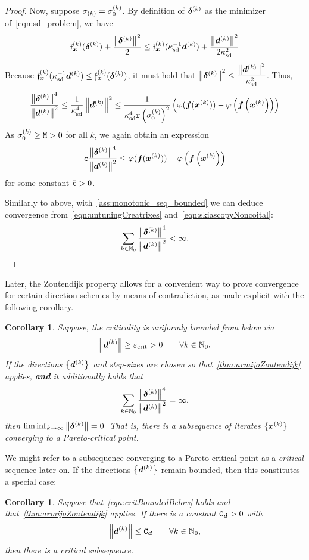 \documentclass{article}
\theoremstyle{plain}
\newtheorem{corollary}[theorem]{Corollary}
\theoremstyle{definition}
\begin{document}
\begin{proof}
	Now, suppose $\sigma_{(k)} = \sigma^{(k)}_{0}$.
	By definition of $\bm{\delta}^{(k)}$ as the minimizer of~\eqref{eqn:sd_problem}, we have
	$$
	\mathfrak{f}_{\bm{x}}^{(k)}(\bm{\delta}^{(k)}) + \frac{\left\|\bm{\delta}^{(k)}\right\|^2}{2}
	\leq
	\mathfrak{f}_{\bm{x}}^{(k)}(\kappa_{\mathrm{sd}}^{-1}\bm{d}^{(k)}) + \frac{\left\|\bm{d}^{(k)}\right\|^2}{2\kappa_{\mathrm{sd}}^2}
	$$
	Because $\mathfrak{f}_{\bm{x}}^{(k)}(\kappa_{\mathrm{sd}}^{-1}\bm{d}^{(k)}) \leq \mathfrak{f}_{\bm{x}}^{(k)}(\bm{\delta}^{(k)})$,
	it must hold that $\left\|\bm{\delta}^{(k)}\right\|^2 \leq \dfrac{\left\|\bm{d}^{(k)}\right\|^2}{\kappa_{\mathrm{sd}}^2}$.
	Thus,
	$$
	\frac{
		\left\|\bm{\delta}^{(k)}\right\|^4
	}{
		\left\|\bm{d}^{(k)}\right\|^2
	}
	\leq
	\frac{1}{\kappa_{\mathrm{sd}}^4}
	\left\|\bm{d}^{(k)}\right\|^2
	\leq
	\frac{1}{\kappa_{\mathrm{sd}}^4\mathtt{r}\left(\sigma^{(k)}_{0}\right)^2}
	\left(
	\varphi(\bm{f}(\bm{x}^{(k)}))
	-
	\varphi\left(\bm{f}\left(\bm{x}^{(k)}\right)\right)
	\right)
	$$
	As $\sigma^{(k)}_{0} \ge \mathtt{M} > 0$ for all $k$,
	we again obtain an expression
	\begin{equation}
	\bar{\mathtt c}
	\frac{
		\left\|\bm{\delta}^{(k)}\right\|^4
	}{
		\left\|\bm{d}^{(k)}\right\|^2
	}
	\leq
	\varphi(\bm{f}(\bm{x}^{(k)}))
	-
	\varphi\left(\bm{f}\left(\bm{x}^{(k)}\right)\right)
	\label{eqn:skiascopyNoncoital}
    \end{equation}
	for some constant $\bar{\mathtt c}>0$.

	Similarly to above,
	with~\cref{ass:monotonic_seq_bounded} we can 
	deduce convergence from~\eqref{eqn:untuningCreatrixes}
	and~\eqref{eqn:skiascopyNoncoital}:
	$$
	\sum_{k\in\mathbb N_0}\frac{
		\left\|\bm{\delta}^{(k)}\right\|^4
	}{
		\left\|\bm{d}^{(k)}\right\|^2
	}
	<
	\infty.
	$$
\end{proof}

Later, the Zoutendijk property allows for a convenient 
way to prove convergence for certain direction schemes
by means of contradiction, as 
made explicit with the following corollary.
\begin{corollary}\label{thm:convergence}
	Suppose, the criticality is uniformly bounded from below via
	\begin{equation}
		\left\|\bm{d}^{(k)}\right\| \geq \varepsilon_{\mathrm{crit}} > 0 
		\qquad \forall k\in\mathbb N_0.
		\label{eqn:critBoundedBelow}
	\end{equation}
	If the directions $\left\{\bm{d}^{(k)}\right\}$ and 
	step-sizes are chosen so 
	that~\cref{thm:armijoZoutendijk}
	applies, \textbf{and} it additionally holds that
	$$
		\sum_{k\in\mathbb N_0}
		\frac{\left\|\bm{\delta}^{(k)}\right\|^4}{\left\|\bm{d}^{(k)}\right\|^2}
		= 
		\infty
		,
	$$
	then
	$
	\liminf_{k \to \infty}
	\left\|\bm{\delta}^{(k)}\right\| = 0.
	$
	That is, there is a subsequence of iterates $\{\bm{x}^{(k)}\}$
	converging to a Pareto-critical point.
\end{corollary}

We might refer to a subsequence converging to a 
Pareto-critical point as a \emph{critical} sequence
later on.
If the directions $\left\{\bm{d}^{(k)}\right\}$ remain bounded, then
this constitutes a special case:
\begin{corollary}%
	\label{thm:dirsBoundedConvergence}
	Suppose that~\eqref{eqn:critBoundedBelow} holds and 
	that~\cref{thm:armijoZoutendijk} applies.
	If there is a constant $\mathtt C_{\bm{d}} > 0$ with 
	$$
	\left\|\bm{d}^{(k)}\right\| \leq \mathtt C_{\bm{d}}
	\qquad \forall k \in \mathbb N_0,
	$$
	then there is a critical subsequence.
\end{corollary}
\end{document}
